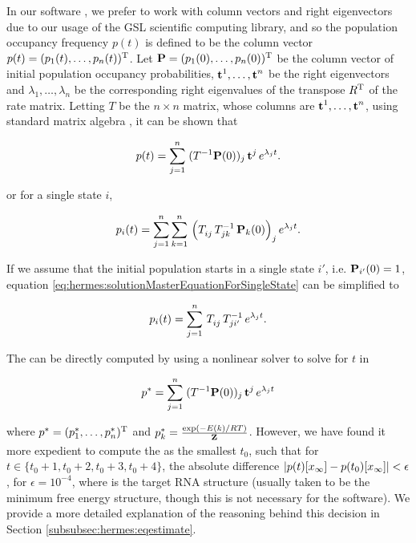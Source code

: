 In our software \hermes, we prefer to work with column vectors and
right eigenvectors due to our usage of the GSL scientific computing library,
and so the population occupancy frequency
$p(t)$ is defined to be the column vector
$p(t)=(p_1(t),\dots,p_n(t))^{\text T}$. Let
$\mbox{\bf P} = (p_1(0),\dots,p_n(0))^{\text T}$ be the column vector of initial
population occupancy probabilities,
$\mbox{\bf t}^1,\dots,\mbox{\bf t}^n$ be the right eigenvectors and
$\lambda_1,\dots,\lambda_n$ be the corresponding right eigenvalues of the
transpose $R^{\text T}$ of the rate matrix.
Letting $T$ be the $n\times n$ matrix, whose columns are
$\mbox{\bf t}^1,\dots,\mbox{\bf t}^n$, using standard matrix algebra
\citep{matrixtheory}, it can be shown that

\begin{align}
\label{eq:hermes:solutionMasterEquation}
p(t) = \sum_{j=1}^n\; (T^{-1}
\mathbbP(0))_j\, \mathbbt^j\, e^{\lambda_j t}.
\end{align}

or for a single state $i$,

\begin{align}
\label{eq:hermes:solutionMasterEquationForSingleState}
p_i(t) = \sum_{j=1}^n \sum_{k=1}^n\, \left(
T_{ij}^{\vphantom{-1}}\, T_{jk}^{-1}\, \mathbbP_k(0)
\right)_j e^{\lambda_j t}.
\end{align}

If we assume that the initial population starts in a single state $i'$,
i.e. $\mbox{\bf P}_{i'}(0) = 1$, equation
\ref{eq:hermes:solutionMasterEquationForSingleState} can be simplified to

\begin{align}
\label{eq:hermes:solutionMasterEquationForSingleStateFixedStartPop}
p_i(t) = \sum_{j=1}^n\, T_{ij}^{\vphantom{-1}}\, T_{ji'}^{-1}\, e^{\lambda_j t}.
\end{align}

The {\em \eqt} can be directly computed by using a
nonlinear solver to solve for $t$ in

\begin{align}
\label{eq:hermes:solutionEquilibriumTime}
\pSt = \sum_{j=1}^n\; (T^{-1}
\mathbbP(0))_j\, \mathbbt^j\, e^{\lambda_j t}
\end{align}

where $p^*=(p^*_1,\dots,p^*_n)^{\text T}$ and $p^*_k = \frac{\exp(-E(k)/RT)}{{\bf Z}^{}_{}}$.
However, we have found it more
expedient to compute the {\em \eqt} as the smallest $t_0$,
such that for $t \in \{t_0+1,t_0+2,t_0+3,t_0+4\}$, the absolute difference
$|p(t)[x_\infty] - p(t_0)[x_\infty]| < \epsilon$, for $\epsilon =
10^{-4}$, where \xEnd is the target RNA structure (usually taken
to be the minimum free energy structure, though this is not necessary for
the software). We provide a more detailed explanation of the reasoning behind
this decision in Section \ref{subsubsec:hermes:eqestimate}.

